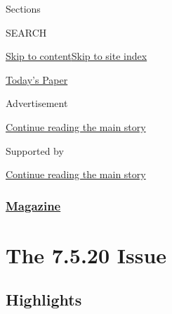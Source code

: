 Sections

SEARCH

\protect\hyperlink{site-content}{Skip to
content}\protect\hyperlink{site-index}{Skip to site index}

\href{https://myaccount.nytimes3xbfgragh.onion/auth/login?response_type=cookie\&client_id=vi}{}

\href{https://www.nytimes3xbfgragh.onion/section/todayspaper}{Today's
Paper}

Advertisement

\protect\hyperlink{after-top}{Continue reading the main story}

Supported by

\protect\hyperlink{after-sponsor}{Continue reading the main story}

\hypertarget{magazine}{%
\subsubsection{\texorpdfstring{\href{/section/magazine}{Magazine}}{Magazine}}\label{magazine}}

\hypertarget{the-7520-issue}{%
\section{The 7.5.20 Issue}\label{the-7520-issue}}

\hypertarget{highlights}{%
\subsection{Highlights}\label{highlights}}

